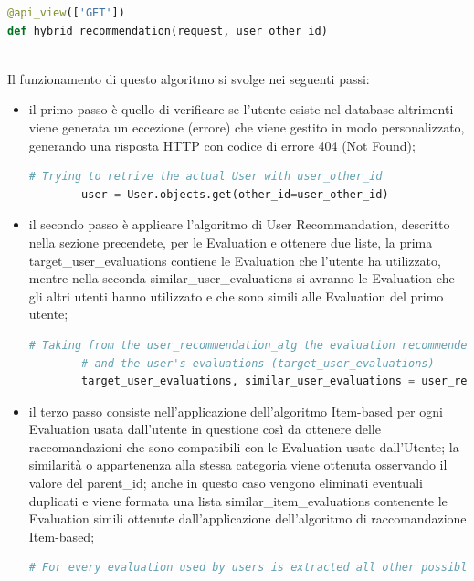 \begin{lstlisting}[language=Python, label=lst:CF_Hybrid_Evaluation_1, caption={\ }]
@api_view(['GET'])
def hybrid_recommendation(request, user_other_id)
\end{lstlisting} 
\ \\
Il funzionamento di questo algoritmo si svolge nei seguenti passi:
\begin{itemize}
	\item il primo passo è quello di verificare se l'utente esiste nel database altrimenti viene generata un eccezione (errore) che viene gestito in
	modo personalizzato, generando una risposta HTTP con codice di errore 404 (Not Found);
	\begin{lstlisting}[language=Python, label=lst:CF_Hybrid_Evaluation_2]
		# Trying to retrive the actual User with user_other_id
		user = User.objects.get(other_id=user_other_id)
	\end{lstlisting} 
	\item il secondo passo è applicare l'algoritmo di User Recommandation, descritto nella sezione precendete, per le Evaluation e ottenere due liste,
	la prima target\_user\_evaluations contiene le Evaluation che l'utente ha utilizzato, mentre nella seconda similar\_user\_evaluations si avranno
	le Evaluation che gli altri utenti hanno utilizzato e che sono simili alle Evaluation del primo utente;
	\begin{lstlisting}[language=Python, label=lst:CF_Hybrid_Evaluation_3]
		# Taking from the user_recommendation_alg the evaluation recommended from this approach (similar_user_evaluations)
		# and the user's evaluations (target_user_evaluations)
		target_user_evaluations, similar_user_evaluations = user_recommendation_alg(user_other_id)
	\end{lstlisting} 
	\item il terzo passo consiste nell'applicazione dell'algoritmo Item-based per ogni Evaluation usata dall'utente in questione così da ottenere 
	delle raccomandazioni che sono compatibili con le Evaluation usate dall'Utente; la similarità o appartenenza alla stessa categoria viene 
	ottenuta osservando il valore del parent\_id; anche in questo caso vengono eliminati eventuali duplicati e viene formata una lista 
	similar\_item\_evaluations contenente le Evaluation simili ottenute dall'applicazione dell'algoritmo di raccomandazione Item-based;
	\begin{lstlisting}[language=Python, label=lst:CF_Hybrid_Evaluation_4]
		# For every evaluation used by users is extracted all other possible evaluations that have the same 'parent_id'

\end{lstlisting}
\end{itemize}
